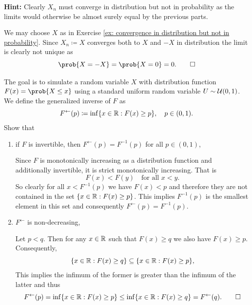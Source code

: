 \begin{exercise}
\begin{enumerate}[label=(\alph*), resume, noitemsep]
        \textbf{Hint:} Clearly \(X_n\) must converge in distribution but not
        in probability as the limits would otherwise be almost surely equal by the
        previous parts.

        \begin{solution}
            We may choose \(X\) as in Exercise \ref{ex: convergence in distribution but not in probability}.
            Since \(X_n \coloneq X\) converges both to \(X\) and \(-X\) in
            distribution the limit is clearly not unique as
            \[
                \prob{X = -X} = \prob{X=0}= 0.
                \qedhere
            \]
        \end{solution}
    \end{enumerate}
\end{exercise}

\begin{exercise}
    \label{ex: stochastic simulation}
    The goal is to simulate a random variable \(X\) with distribution 
    function \(F(x) = \prob{X \le x}\) using a standard uniform random variable
    \(U\sim \mathcal{U}(0,1)\). We define the generalized inverse of \(F\) as
    \[
        F^{\leftarrow}(p) \coloneq \inf\{x \in \mathbb{R} : F(x) \ge p\}, \quad p \in (0,1).
    \]
    Show that
    \begin{enumerate}[label=(\alph*), noitemsep]
        \item\label{it: quantile if invertible} if \(F\) is invertible, then \(F^{\leftarrow}(p) = F^{-1}(p)\) for all
        \(p \in (0,1)\),
        \begin{solution}
            Since \(F\) is monotonically increasing as a distribution
            function and additionally invertible, it is strict monotonically
            increasing. That is
            \[
                F(x) < F(y) \quad \text{for all } x < y.
            \]
            So clearly for all \(x< F^{-1}(p)\) we have \(F(x) < p\) and
            therefore they are not contained in the set \(\{x\in \mathbb{R} : F(x)
            \ge p\}\). This implies \(F^{-1}(p)\) is the smallest element in this set
            and consequently \(F^{\leftarrow}(p) = F^{-1}(p)\).
        \end{solution}

        \item\label{it: monotonicity} \(F^{\leftarrow}\) is non-decreasing,
        \begin{solution}
            Let \(p < q\). Then for any \(x \in \mathbb{R}\) such that \(F(x) \ge q\)
            we also have \(F(x) \ge p\). Consequently,
            \[
                \{x \in \mathbb{R} : F(x) \ge q\} \subseteq \{x \in \mathbb{R} : F(x) \ge p\},
            \]
            This implies the infimum of the former is greater than the infimum of the latter
            and thus
            \[
                F^{\leftarrow}(p) = \inf\{x \in \mathbb{R} : F(x) \ge p\} \le \inf\{x \in \mathbb{R} : F(x) \ge q\} = F^{\leftarrow}(q).
                \qedhere
            \]
        \end{solution}


\end{enumerate}
\end{exercise}

